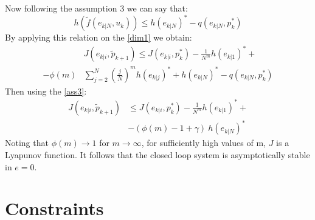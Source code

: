 Now following the assumption 3 we can say that:
\begin{equation*}
    h(\tilde{f}(e_{k|N},u_k)) \le h(e_{k|N})^*-q(e_{k|N},p_k^*)
\end{equation*}
By applying this relation on the \ref{dim1} we obtain: 
\begin{equation*}
    \begin{split}
        &J({e}_{k|i},\tilde{p}_{k+1})\le J({e}_{k|i},p_{k}^*) - \frac{1}{N^m}h(e_{k|1})^*+ \\ 
        -\phi(m)&\sum_{j=2}^{N}\left(\frac{j}{N}\right)^m h(e_{k|j})^*+ h(e_{k|N})^*-q(e_{k|N},p_k^*)
    \end{split}
\end{equation*}
Then using the \ref{ass3}:
\begin{equation*}
    \begin{split}
        J({e}_{k|i},\tilde{p}_{k+1})&\le J({e}_{k|i},p_{k}^*) - \frac{1}{N^m}h(e_{k|1})^*+ \\ 
            &-(\phi(m)-1+\gamma)\ h(e_{k|N})^*
    \end{split}
\end{equation*}
Noting that $\phi(m) \rightarrow 1$ for $m \rightarrow \infty$, for sufficiently high values of m, $J$ is a Lyapunov function. It follows that the closed loop system is asymptotically stable in $e=0$.



\section{Constraints}

